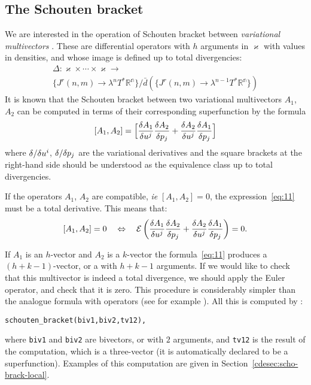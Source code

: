 \subsection{The Schouten bracket}
\label{cdesec:schouten-bracket}

We are interested in the operation of Schouten bracket between
\emph{variational multivectors} \cite{IgoninVerbovetskyVitolo:2004}. These are differential operators
with $h$ arguments in $\varkappa$ with values in densities, and whose image is
defined up to total divergencies:
\begin{multline}
  \label{eq:16}
  \Delta\colon \varkappa\times\cdots\times \varkappa \to
  \\
  \{J^r(n,m) \to \lambda^nT^*\mathbb{R^n}\}/
  \bar{d}(\{J^r(n,m) \to \lambda^{n-1} T^*\mathbb{R^n}\})
\end{multline}
It is known \cite{Getzler:2002,KerstenKrasilshchikVerboretsky:2004} that the Schouten bracket between two variational
multivectors $A_1$, $A_2$ can be computed in terms of their corresponding
superfunction by the formula
\begin{equation}\label{eq:11}
  [A_1,A_2] = \Big[\fd{A_1}{u^j}\fd{A_2}{p_j} + \fd{A_2}{u^j}\fd{A_1}{p_j}\Big]
\end{equation}
where $\fd{}{u^i}$, $\fd{}{p_j}$ are the variational derivatives and
the square brackets at the right-hand side should be understood as the
equivalence class up to total divergencies.

If the operators $A_1$, $A_2$ are compatible, \emph{ie} $[A_1,A_2]=0$, the
expression~\eqref{eq:11} must be a total derivative. This means that:
\begin{equation}
  \label{eq:14}
  [A_1,A_2] = 0 \quad\Leftrightarrow\quad
  \mathcal{E}\left(\fd{A_1}{u^j}\fd{A_2}{p_j} +
    \fd{A_2}{u^j}\fd{A_1}{p_j}\right)=0.
\end{equation}

If $A_1$ is an $h$-vector and $A_2$ is a $k$-vector the formula~\eqref{eq:11}
produces a $(h+k-1)$-vector, or a \cdiffop with $h+k-1$ arguments. If we would
like to check that this multivector is indeed a total divergence, we should
apply the Euler operator, and check that it is zero. This procedure is
considerably simpler than the analogue formula with operators (see for example
\cite{KerstenKrasilshchikVerboretsky:2004}). All this is computed by \cde:

\begin{verbatim}
schouten_bracket(biv1,biv2,tv12),
\end{verbatim}
where \texttt{biv1} and \texttt{biv2} are bivectors, or \cdiffops with $2$
arguments, and \texttt{tv12} is the result of the computation, which is a
three-vector (it is automatically declared to be a superfunction). Examples of
this computation are given in Section~\ref{cdesec:scho-brack-local}.


